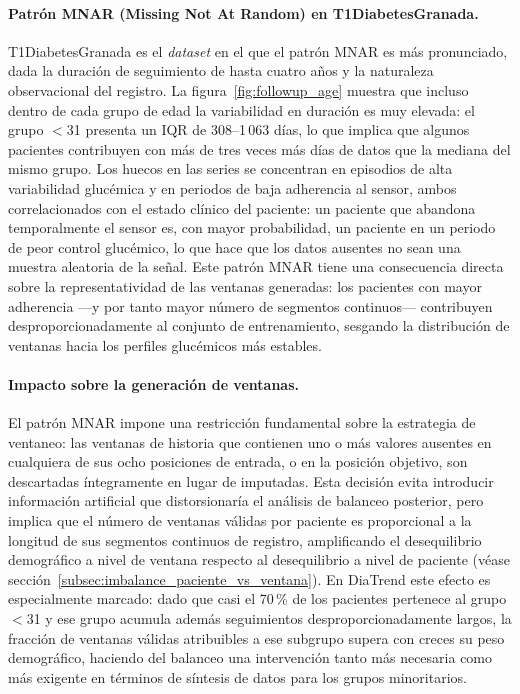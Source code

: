 \paragraph{Patrón MNAR (Missing Not At Random) en T1DiabetesGranada.}
T1DiabetesGranada es el \textit{dataset} en el que el patrón MNAR es más
pronunciado, dada la duración de seguimiento de hasta cuatro años y la naturaleza
observacional del registro. La figura~\ref{fig:followup_age} muestra que incluso
dentro de cada grupo de edad la variabilidad en duración es muy elevada: el grupo
$<$31 presenta un IQR de 308--1\,063 días, lo que implica que algunos pacientes
contribuyen con más de tres veces más días de datos que la mediana del mismo grupo.
Los huecos en las series se concentran en episodios de alta variabilidad glucémica
y en periodos de baja adherencia al sensor, ambos correlacionados con el estado
clínico del paciente: un paciente que abandona temporalmente el sensor es,
con mayor probabilidad, un paciente en un periodo de peor control glucémico,
lo que hace que los datos ausentes no sean una muestra aleatoria de la señal.
Este patrón MNAR tiene una consecuencia directa sobre la representatividad de
las ventanas generadas: los pacientes con mayor adherencia ---y por tanto mayor
número de segmentos continuos--- contribuyen desproporcionadamente al conjunto
de entrenamiento, sesgando la distribución de ventanas hacia los perfiles
glucémicos más estables.

\paragraph{Impacto sobre la generación de ventanas.}
El patrón MNAR impone una restricción fundamental sobre la estrategia de
ventaneo: las ventanas de historia que contienen uno o más valores ausentes en
cualquiera de sus ocho posiciones de entrada, o en la posición objetivo, son
descartadas íntegramente en lugar de imputadas. Esta decisión evita introducir
información artificial que distorsionaría el análisis de balanceo posterior,
pero implica que el número de ventanas válidas por paciente es proporcional a
la longitud de sus segmentos continuos de registro, amplificando el desequilibrio
demográfico a nivel de ventana respecto al desequilibrio a nivel de paciente
(véase sección~\ref{subsec:imbalance_paciente_vs_ventana}). En DiaTrend este
efecto es especialmente marcado: dado que casi el 70\,\% de los pacientes
pertenece al grupo $<$31 y ese grupo acumula además seguimientos
desproporcionadamente largos, la fracción de ventanas válidas atribuibles a ese
subgrupo supera con creces su peso demográfico, haciendo del balanceo una
intervención tanto más necesaria como más exigente en términos de síntesis de
datos para los grupos minoritarios.
